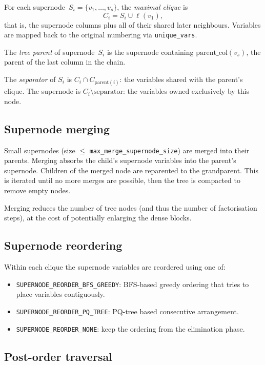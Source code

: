 \documentclass[11pt]{article}
\begin{document}
For each supernode~$S_i = \{v_1,\ldots,v_s\}$, the \emph{maximal clique}
is
\[
  C_i = S_i \cup \ell(v_1),
\]
that is, the supernode columns plus all of their shared later neighbours.
Variables are mapped back to the original numbering via
\texttt{unique\_vars}.

The \emph{tree parent} of supernode~$S_i$ is the supernode containing
$\mathrm{parent\_col}(v_s)$, the parent of the last column in the chain.

The \emph{separator} of $S_i$ is $C_i \cap C_{\mathrm{parent}(i)}$: the
variables shared with the parent's clique.  The supernode is
$C_i \setminus \text{separator}$: the variables owned exclusively by this
node.

\subsection{Supernode merging}

Small supernodes (size $\le$ \texttt{max\_merge\_supernode\_size}) are
merged into their parents.  Merging absorbs the child's supernode variables
into the parent's supernode.  Children of the merged node are reparented to
the grandparent.  This is iterated until no more merges are possible, then
the tree is compacted to remove empty nodes.

Merging reduces the number of tree nodes (and thus the number of
factorisation steps), at the cost of potentially enlarging the dense blocks.

\subsection{Supernode reordering}

Within each clique the supernode variables are reordered using one of:
\begin{itemize}
  \item \texttt{SUPERNODE\_REORDER\_BFS\_GREEDY}: BFS-based greedy
    ordering that tries to place variables contiguously.
  \item \texttt{SUPERNODE\_REORDER\_PQ\_TREE}: PQ-tree based consecutive
    arrangement.
  \item \texttt{SUPERNODE\_REORDER\_NONE}: keep the ordering from the
    elimination phase.
\end{itemize}

\subsection{Post-order traversal}
\end{document}
